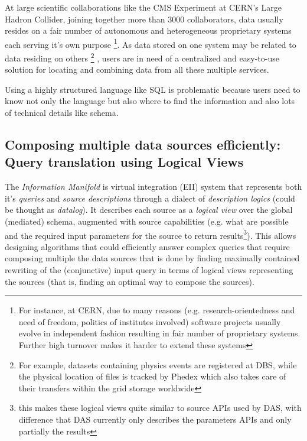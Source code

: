 {\color{red}
At large scientific collaborations like the CMS Experiment at CERN's Large Hadron Collider, joining together more than 3000 collaborators, data usually resides on a fair number of autonomous and heterogeneous proprietary systems each serving it's own purpose
\footnote{For instance, at CERN,  due to many reasons (e.g. research-orientedness and need of freedom, politics of institutes involved) software projects usually evolve in independent fashion resulting in fair number of proprietary systems\cite{Koch00CERN}. Further high turnover makes it harder to extend these systems}. As data stored on one system may be related to data residing on others%
	\footnote{For example, datasets containing physics events are registered at DBS, while the physical location of files is tracked by Phedex which also takes care of their transfers within the grid storage worldwide}%
, users are in need of a centralized and easy-to-use solution for locating and combining data from all these multiple services.

Using a highly structured language like SQL is problematic because users need to know not only the language but also where to find the information and also lots of technical details like schema. %
}




\subsection{Composing multiple data sources efficiently: Query translation using Logical Views\label{IM_query_translation}}
The \textit{Information Manifold}\cite{Levy96} is virtual integration (EII) system that represents  both it's \textit{queries} and \textit{source descriptions} through a dialect of \textit{description logics} (could be thought as \textit{datalog}).  It describes each source as a \textit{logical view} over the global (mediated) schema, augmented with source capabilities (e.g. what are possible and the required input parameters for the source to return results\footnote{this makes these logical views quite similar to source APIs used by DAS, with difference that DAS currently only describes the parameters APIs and only partially the results}).
%
This allows designing algorithms that could efficiently answer complex queries that require composing multiple the data sources that is done by finding maximally contained rewriting of the (conjunctive) input query in terms of logical views representing the sources (that is, finding an optimal way to compose the sources).

